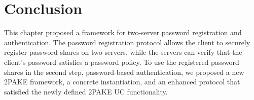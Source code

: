 









\section{Conclusion} \label{sec:2pakeConclusion}
This chapter proposed a framework for two-server password registration and authentication.
The password registration protocol allows the client to securely register password shares on two servers, while the servers can verify that the client's password satisfies a password policy.
To use the registered password shares in the second step, password-based authentication, we proposed a new \ac{2PAKE} framework, a concrete instantiation, and an enhanced protocol that satisfied the newly defined \ac{2PAKE} \ac{UC} functionality.
